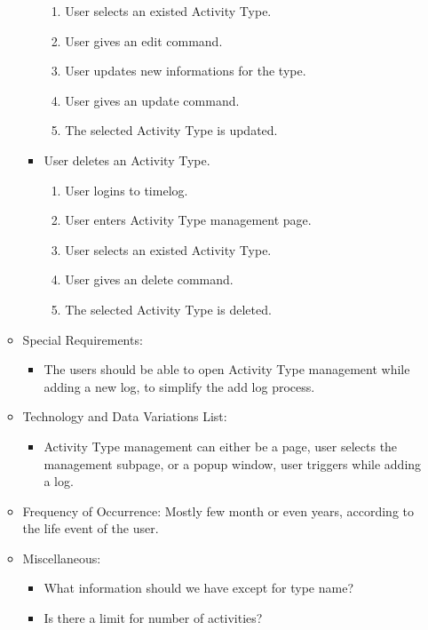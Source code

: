 \documentclass[12pt, a4paper]{article}
\begin{document}
\begin{CJK*}{UTF8}{bkai}
\begin{enumerate}
\begin{itemize}
\begin{itemize}
\begin{enumerate}
                  \item User selects an existed Activity Type.
                  \item User gives an edit command.
                  \item User updates new informations for the type.
                  \item User gives an update command.
                  \item The selected Activity Type is updated.
                \end{enumerate}
              \item User deletes an Activity Type.
                \begin{enumerate}
                  \item User logins to timelog.
                  \item User enters Activity Type management page.
                  \item User selects an existed Activity Type.
                  \item User gives an delete command.
                  \item The selected Activity Type is deleted.
                \end{enumerate}
            \end{itemize}
          \item Special Requirements:
            \begin{itemize}
              \item The users should be able to open Activity Type management while adding a new log, to simplify the add log process.
            \end{itemize}
          \item Technology and Data Variations List:
            \begin{itemize}
              \item Activity Type management can either be a page, user selects the management subpage, or a popup window, user triggers while adding a log.
            \end{itemize}
          \item Frequency of Occurrence: Mostly few month or even years, according to the life event of the user.
          \item Miscellaneous:
            \begin{itemize}
              \item What information should we have except for type name?
              \item Is there a limit for number of activities?

\end{itemize}
\end{itemize}
\end{enumerate}
\end{CJK*}
\end{document}
